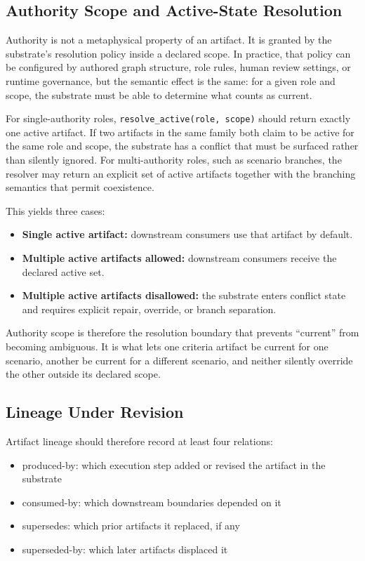 \documentclass{article}
\begin{document}
\subsection{Authority Scope and Active-State Resolution}

Authority is not a metaphysical property of an artifact. It is granted by the substrate's resolution policy inside a declared scope. In practice, that policy can be configured by authored graph structure, role rules, human review settings, or runtime governance, but the semantic effect is the same: for a given role and scope, the substrate must be able to determine what counts as current.

For single-authority roles, \texttt{resolve\_active(role, scope)} should return exactly one active artifact. If two artifacts in the same family both claim to be active for the same role and scope, the substrate has a conflict that must be surfaced rather than silently ignored. For multi-authority roles, such as scenario branches, the resolver may return an explicit set of active artifacts together with the branching semantics that permit coexistence.

This yields three cases:
\begin{itemize}
\item \textbf{Single active artifact:} downstream consumers use that artifact by default.
\item \textbf{Multiple active artifacts allowed:} downstream consumers receive the declared active set.
\item \textbf{Multiple active artifacts disallowed:} the substrate enters conflict state and requires explicit repair, override, or branch separation.
\end{itemize}

Authority scope is therefore the resolution boundary that prevents ``current'' from becoming ambiguous. It is what lets one criteria artifact be current for one scenario, another be current for a different scenario, and neither silently override the other outside its declared scope.

\subsection{Lineage Under Revision}

Artifact lineage should therefore record at least four relations:
\begin{itemize}
\item produced-by: which execution step added or revised the artifact in the substrate
\item consumed-by: which downstream boundaries depended on it
\item supersedes: which prior artifacts it replaced, if any
\item superseded-by: which later artifacts displaced it
\end{itemize}
\end{document}

